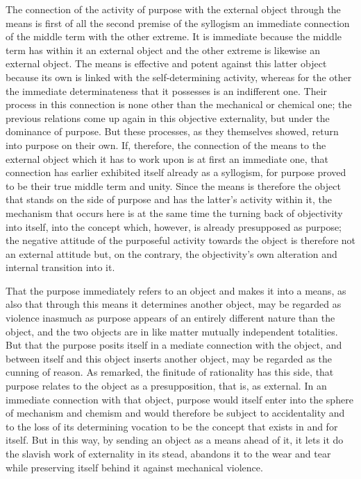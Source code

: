 The connection of the activity of purpose
with the external object through the means is
first of all the second premise of the syllogism
an immediate connection of the middle term
with the other extreme.
It is immediate because the middle term
has within it an external object
and the other extreme is likewise an external object.
The means is effective and potent
against this latter object
because its own is linked with
the self-determining activity,
whereas for the other the immediate determinateness
that it possesses is an indifferent one.
Their process in this connection is
none other than the mechanical or chemical one;
the previous relations come up again
in this objective externality,
but under the dominance of purpose.
But these processes, as they themselves showed,
return into purpose on their own.
If, therefore, the connection of the means
to the external object which it has to work upon is
at first an immediate one,
that connection has earlier exhibited
itself already as a syllogism,
for purpose proved to be their
true middle term and unity.
Since the means is therefore the object
that stands on the side of purpose
and has the latter's activity within it,
the mechanism that occurs here is
at the same time the turning back of
objectivity into itself, into the concept
which, however, is already presupposed as purpose;
the negative attitude of the purposeful activity
towards the object is therefore not
an external attitude but, on the contrary,
the objectivity's own alteration
and internal transition into it.

That the purpose immediately
refers to an object
and makes it into a means,
as also that through this means
it determines another object,
may be regarded as violence inasmuch as
purpose appears of an entirely
different nature than the object,
and the two objects are in like matter
mutually independent totalities.
But that the purpose posits itself in a
mediate connection with the object,
and between itself and this object inserts
another object, may be regarded as the cunning of reason.
As remarked, the finitude of rationality has this side,
that purpose relates to the object
as a presupposition, that is, as external.
In an immediate connection with that object,
purpose would itself enter into
the sphere of mechanism and chemism
and would therefore be subject to accidentality
and to the loss of its determining vocation
to be the concept that exists in and for itself.
But in this way,
by sending an object as
a means ahead of it,
it lets it do the slavish work of
externality in its stead,
abandons it to the wear and tear
while preserving itself behind it
against mechanical violence.

